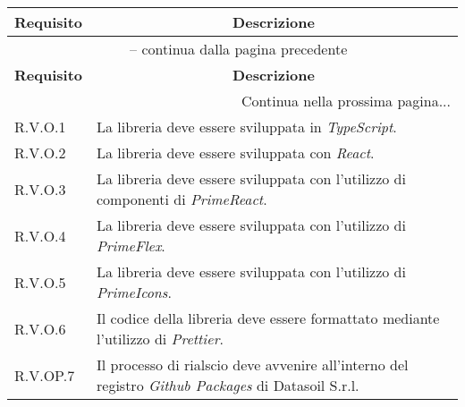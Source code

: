 \begin{center}
    \begin{longtable}{|p{2.5cm}|p{10cm}|}
        \hline
        \rowcolor{gray!30}
        \textbf{Requisito} & \multicolumn{1}{c|}{\textbf{Descrizione}}                                                 \\
        \hline
        \endfirsthead
        \hline
        \multicolumn{2}{|c|}{{\tablename\ \thetable{} -- continua dalla pagina precedente}}                            \\
        \hline
        \rowcolor{gray!30}
        \textbf{Requisito} & \multicolumn{1}{c|}{\textbf{Descrizione}}                                                 \\
        \endhead
        \hline
        \multicolumn{2}{|r|}{{Continua nella prossima pagina...}}                                                      \\
        \hline
        \endfoot
        \hline
        \endlastfoot
        \hline
        R.V.O.1            & La libreria deve essere sviluppata in \textit{TypeScript}.                                \\
        \hline
        R.V.O.2            & La libreria deve essere sviluppata con \textit{React}.                                    \\
        \hline
        R.V.O.3            & La libreria deve essere sviluppata con l'utilizzo di componenti di \textit{PrimeReact}.   \\
        \hline
        R.V.O.4            & La libreria deve essere sviluppata con l'utilizzo di \textit{PrimeFlex}.                  \\
        \hline
        R.V.O.5            & La libreria deve essere sviluppata con l'utilizzo di \textit{PrimeIcons}.                 \\
        \hline
        R.V.O.6            & Il codice della libreria deve essere formattato mediante l'utilizzo di \textit{Prettier}. \\
        \hline
        R.V.OP.7           & Il processo di rialscio deve avvenire all'interno del registro \textit{Github Packages}
        di Datasoil S.r.l.                                                                                             \\
    \end{longtable}
    \label{tab:requisiti_vincolo}
\end{center}
